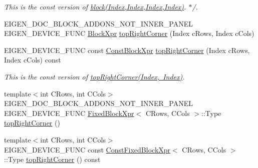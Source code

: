 \begin{DoxyCompactItemize}
\begin{DoxyCompactList}\small\item\em This is the const version of \mbox{\hyperlink{class_eigen_1_1_dense_base_ab8e42e67c5cfd5fa13e684642f0f65bf}{block(\+Index,\+Index,\+Index,\+Index)}}. $\ast$/. \end{DoxyCompactList}\item 
E\+I\+G\+E\+N\+\_\+\+D\+O\+C\+\_\+\+B\+L\+O\+C\+K\+\_\+\+A\+D\+D\+O\+N\+S\+\_\+\+N\+O\+T\+\_\+\+I\+N\+N\+E\+R\+\_\+\+P\+A\+N\+EL E\+I\+G\+E\+N\+\_\+\+D\+E\+V\+I\+C\+E\+\_\+\+F\+U\+NC \mbox{\hyperlink{class_eigen_1_1_block}{Block\+Xpr}} \mbox{\hyperlink{class_eigen_1_1_dense_base_a5ef049952634d83e1c18bcda3a3e980c}{top\+Right\+Corner}} (Index c\+Rows, Index c\+Cols)
\item 
\mbox{\label{class_eigen_1_1_dense_base_acbe29cde3b49701fd0394357a96437a9}} 
E\+I\+G\+E\+N\+\_\+\+D\+E\+V\+I\+C\+E\+\_\+\+F\+U\+NC const \mbox{\hyperlink{class_eigen_1_1_block}{Const\+Block\+Xpr}} \mbox{\hyperlink{class_eigen_1_1_dense_base_acbe29cde3b49701fd0394357a96437a9}{top\+Right\+Corner}} (Index c\+Rows, Index c\+Cols) const
\begin{DoxyCompactList}\small\item\em This is the const version of \mbox{\hyperlink{class_eigen_1_1_dense_base_a5ef049952634d83e1c18bcda3a3e980c}{top\+Right\+Corner(\+Index, Index)}}. \end{DoxyCompactList}\item 
{\footnotesize template$<$int C\+Rows, int C\+Cols$>$ }\\E\+I\+G\+E\+N\+\_\+\+D\+O\+C\+\_\+\+B\+L\+O\+C\+K\+\_\+\+A\+D\+D\+O\+N\+S\+\_\+\+N\+O\+T\+\_\+\+I\+N\+N\+E\+R\+\_\+\+P\+A\+N\+EL E\+I\+G\+E\+N\+\_\+\+D\+E\+V\+I\+C\+E\+\_\+\+F\+U\+NC \mbox{\hyperlink{struct_eigen_1_1_dense_base_1_1_fixed_block_xpr}{Fixed\+Block\+Xpr}}$<$ C\+Rows, C\+Cols $>$\+::Type \mbox{\hyperlink{class_eigen_1_1_dense_base_a54bec6dbd37bc39602e0b8e1177d0010}{top\+Right\+Corner}} ()
\item 
\mbox{\label{class_eigen_1_1_dense_base_a234b88ff762ae6d67ffbc5d0cc42b27e}} 
{\footnotesize template$<$int C\+Rows, int C\+Cols$>$ }\\E\+I\+G\+E\+N\+\_\+\+D\+E\+V\+I\+C\+E\+\_\+\+F\+U\+NC const \mbox{\hyperlink{struct_eigen_1_1_dense_base_1_1_const_fixed_block_xpr}{Const\+Fixed\+Block\+Xpr}}$<$ C\+Rows, C\+Cols $>$\+::Type \mbox{\hyperlink{class_eigen_1_1_dense_base_a234b88ff762ae6d67ffbc5d0cc42b27e}{top\+Right\+Corner}} () const

\end{DoxyCompactItemize}
